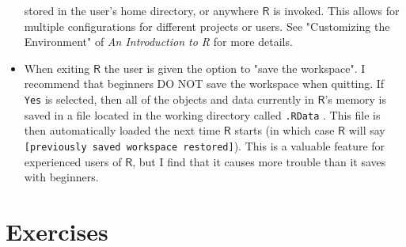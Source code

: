 \begin{itemize}
stored in the user's home directory, or anywhere \(\mathsf{R}\) is
invoked. This allows for multiple configurations for different
projects or users. See "Customizing the Environment" of \emph{An
Introduction to R} for more details.
\item When exiting \(\mathsf{R}\) the user is given the option to "save
the workspace". I recommend that beginners DO NOT save the
workspace when quitting. If \texttt{Yes} is selected, then all of the
objects and data currently in \(\mathsf{R}\)'s memory is saved in a
file located in the working directory called
\texttt{.RData} . This file is then
automatically loaded the next time \(\mathsf{R}\) starts (in which
case \(\mathsf{R}\) will say \texttt{[previously saved workspace
  restored]}). This is a valuable feature for experienced users of
\(\mathsf{R}\), but I find that it causes more trouble than it saves
with beginners.
\end{itemize}

\newpage{}

\section{Exercises}
\label{sec-2-7}
\setcounter{thm}{0}
